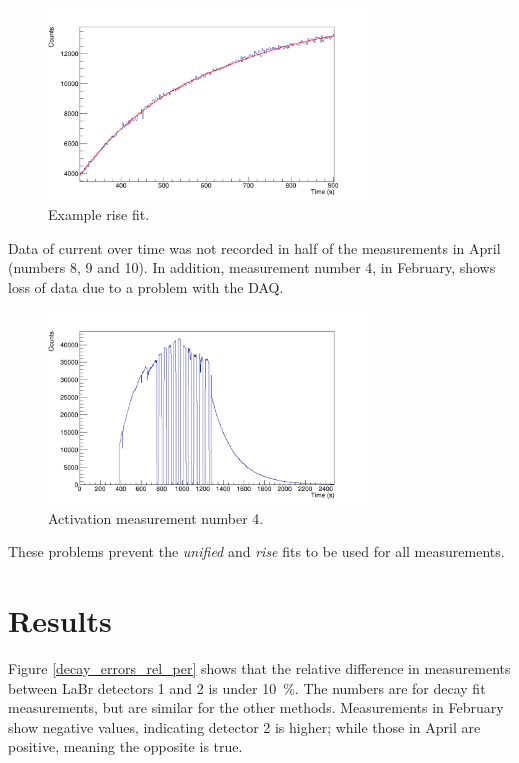 \documentclass[a4paper,12pt]{report}
\begin{document}
\begin{figure}[H]
	\centering
	\includegraphics[width=0.75\textwidth]{example_rise_fit.png}
	\caption{Example rise fit.}
	\label{example_rise_fit}
\end{figure}

Data of current over time was not recorded in half of the measurements in April (numbers 8, 9 and 10).	%
In addition, measurement number 4, in February, shows loss of data due to a problem with the DAQ.

\begin{figure}[H]
	\centering
	\includegraphics[width=0.75\textwidth]{activation_4_time.png}
	\caption{Activation measurement number 4.}
	\label{activation_4_time}
\end{figure}

These problems prevent the \textit{unified} and \textit{rise} fits to be used for all measurements.
\\

\section{Results}
Figure \ref{decay_errors_rel_per} shows that the relative difference in measurements between LaBr detectors 1 and 2 is under \qty{10}{\percent}.
The numbers are for decay fit measurements, but are similar for the other methods.
Measurements in February show negative values, indicating detector 2 is higher; while those in April are positive, meaning the opposite is true.
\end{document}
